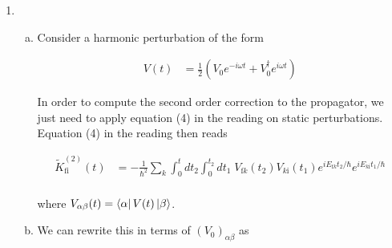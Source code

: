 \documentclass[]{article}
\begin{document}
\begin{enumerate}[1)]
\hfill \\
\noindent\rule{15cm}{0.4pt} \\


\item 

\begin{enumerate}[a)]

\item	Consider a harmonic perturbation of the form

\begin{equation}
\begin{split}
V(t) & = \frac{1}{2}   \left(  V_0 e^{ - i \omega t} +  V_0^\dagger e^{ i \omega t}  \right)
\end{split}
\end{equation}

In order to compute the second order correction to the propagator, we just need to apply equation (4) in the reading on static perturbations. Equation (4) in the reading then reads

\begin{equation}
\begin{split}
\tilde{K}^{(2)}_\text{fi} (t) & = - \frac{1}{\hbar^2} \sum_k \int_0^t dt_2 \int_0^{t_2} dt_1 \; V_{ \text{f} k }(t_2)  V_{ k \text{i}  }(t_1)  e^{  i E_{ \text{f} k } t_2 / \hbar } e^{  i E_{ k \text{i}  } t_1 / \hbar } \\
\end{split}
\end{equation}

where $V_{\alpha \beta }(t) = \bra{ \alpha } V(t)  \ket{ \beta } $. \\

\item We can rewrite  this in terms of $(V_0)_{\alpha \beta }$ as


\end{enumerate}
\end{enumerate}
\end{document}
